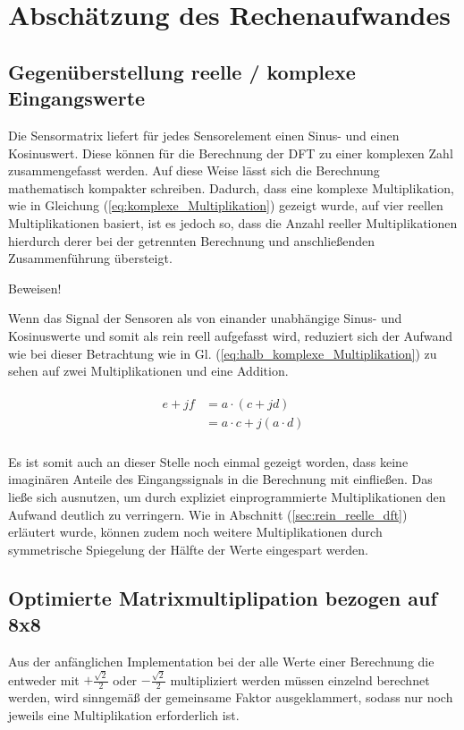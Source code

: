 \section{Abschätzung des Rechenaufwandes}\label{sec:abschaetzung_Rechenaufwand}

\subsection{Gegenüberstellung reelle / komplexe Eingangswerte}
Die Sensormatrix liefert für jedes Sensorelement einen Sinus- und einen Kosinuswert. Diese können für die Berechnung der DFT zu einer komplexen Zahl zusammengefasst werden. 
Auf diese Weise lässt sich die Berechnung mathematisch kompakter schreiben. Dadurch, dass eine komplexe Multiplikation, wie in Gleichung (\ref{eq:komplexe_Multiplikation}) 
gezeigt wurde, auf vier reellen Multiplikationen basiert,
ist es jedoch so, dass die Anzahl reeller Multiplikationen hierdurch derer bei der getrennten Berechnung und anschließenden Zusammenführung übersteigt.

Beweisen!



Wenn das Signal der Sensoren als von einander unabhängige Sinus- und Kosinuswerte  und somit als rein reell aufgefasst wird, reduziert sich der Aufwand wie 
bei dieser Betrachtung wie in Gl. (\ref{eq:halb_komplexe_Multiplikation}) zu sehen auf zwei Multiplikationen und eine Addition. 

\begin{align}\label{eq:halb_komplexe_Multiplikation}
\begin{split}
 e + jf &= a \cdot (c + jd)\\
        &= a \cdot c + j(a \cdot d)\\
\end{split}
\end{align}

Es ist somit auch an dieser Stelle noch einmal gezeigt worden, dass keine imaginären Anteile des Eingangssignals in die Berechnung mit einfließen.
Das ließe sich ausnutzen, um durch expliziet einprogrammierte Multiplikationen den Aufwand deutlich zu verringern. Wie in Abschnitt (\ref{sec:rein_reelle_dft})
erläutert wurde, können zudem noch weitere Multiplikationen durch symmetrische Spiegelung der Hälfte der Werte eingespart werden.

 
  


\subsection{Optimierte Matrixmultiplipation bezogen auf 8x8}\label{sec:OptimierteMatrixmultiplikation}
Aus der anfänglichen Implementation bei der alle Werte einer Berechnung die entweder mit $+\frac{\sqrt{2}}{2}$ oder $-\frac{\sqrt{2}}{2}$ multipliziert werden müssen 
einzelnd berechnet werden, wird sinngemäß der gemeinsame Faktor ausgeklammert, sodass nur noch jeweils eine Multiplikation erforderlich ist.

